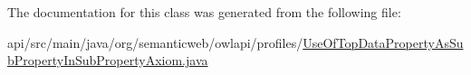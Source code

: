 The documentation for this class was generated from the following file\-:\begin{DoxyCompactItemize}
\item 
api/src/main/java/org/semanticweb/owlapi/profiles/\hyperlink{_use_of_top_data_property_as_sub_property_in_sub_property_axiom_8java}{Use\-Of\-Top\-Data\-Property\-As\-Sub\-Property\-In\-Sub\-Property\-Axiom.\-java}\end{DoxyCompactItemize}
